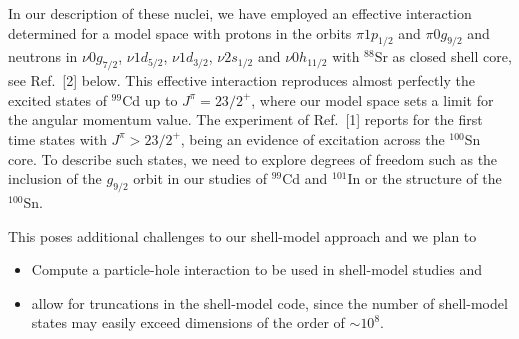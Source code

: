In our description of these nuclei, we have employed an effective
interaction determined for a model space with protons in the orbits
$\pi 1p_{1/2}$ and $\pi 0g_{9/2}$ and neutrons in
$\nu 0g_{7/2}$, $\nu 1d_{5/2}$, $\nu 1d_{3/2}$, $\nu 2s_{1/2}$ and
$\nu 0h_{11/2}$ with $^{88}$Sr as closed shell core, see
Ref.~[2] below. This effective interaction reproduces almost
perfectly the excited states of $^{99}$Cd up to 
$J^{\pi}=23/2^+$, where our model space sets a limit for
the angular momentum value. The experiment of Ref.~[1]
reports for the first time states with $J^{\pi}> 23/2^+$,
being an evidence  of excitation across the $^{100}$Sn 
core. To describe such states, we need 
to explore degrees of freedom such as the 
inclusion of the $g_{9/2}$ orbit in our studies of
$^{99}$Cd and
$^{101}$In or the structure of the $^{100}$Sn.

This poses additional challenges to our shell-model approach
and we plan to
\begin{itemize}
\item Compute a particle-hole interaction to be used in shell-model
      studies and
\item allow for truncations in the shell-model code, since the number
      of shell-model states may easily exceed dimensions of the order
      of $\sim 10^8$. 
\end{itemize}

